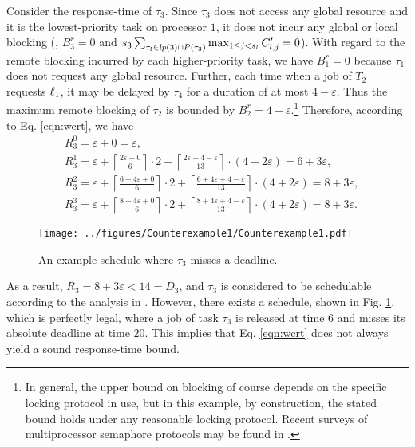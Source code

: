 Consider the response-time of $\tau_3$. Since $\tau_3$ does not access any global resource and it is the lowest-priority task on processor $1$, it does not incur any global or local blocking (\ie, $B_3^r = 0$ and $s_3 \sum_{\tau_l \in \mathit{lp}(3) \cap P(\tau_3)} \max_{1 \leq j < s_l} C_{l,j}^{\prime} = 0$). With regard to the remote blocking incurred by each higher-priority task, we have $B_1^r = 0$ because $\tau_1$ does not request any global resource. Further, each time when a job of $T_2$ requests $\ell_1$, it may be delayed by $\tau_4$ for a duration of at most $4-\varepsilon$. Thus the maximum remote blocking of $\tau_2$ is bounded by $B_2^r = 4-\varepsilon$.\footnote{In general, the upper bound on blocking of course depends on the specific locking protocol in use, but in this example, by construction, the stated bound holds under any reasonable locking protocol. Recent surveys of multiprocessor semaphore protocols may be found in \cite{bbb-2013,yang-2015}.} Therefore, according to Eq. \eqref{eqn:wcrt}, we have
\begin{align*}
& R_3^0 = \varepsilon + 0 = \varepsilon, \\
& R_3^1 = \varepsilon + \left \lceil \frac{2\varepsilon + 0}{6} \right \rceil \cdot 2 + \left \lceil \frac{2\varepsilon + 4 - \varepsilon}{13} \right \rceil \cdot (4+2\varepsilon) =  6+3\varepsilon, \\
& R_3^2 = \varepsilon + \left \lceil \frac{6+4\varepsilon + 0}{6} \right \rceil \cdot 2 + \left \lceil \frac{6+4\varepsilon + 4-\varepsilon}{13} \right \rceil \cdot (4+2\varepsilon) = 8+3\varepsilon, \\
& R_3^3 = \varepsilon + \left \lceil \frac{8+4\varepsilon + 0}{6} \right \rceil \cdot 2 + \left \lceil \frac{8+4\varepsilon + 4-\varepsilon}{13} \right \rceil \cdot (4+2\varepsilon) = 8+3\varepsilon.
\end{align*}

\ifpaper
\begin{figure}[t]
  \centering
  \texttt{[image: ../figures/Counterexample1/Counterexample1.pdf]}
  \caption{An example schedule where $\tau_3$ misses a deadline.}\label{fig:counterexample_protocol}
\end{figure}
 \fi

As a result, $R_3 = 8+3\varepsilon < 14 = D_3$, and $\tau_3$ is considered to be schedulable according to the analysis in \cite{lakshmanan-2009}. However, there exists a schedule, shown in Fig. \ref{fig:counterexample_protocol}, which is perfectly legal, where a job of task $\tau_3$  is released at time $6$ and misses its absolute deadline at time $20$. This implies that Eq. \eqref{eqn:wcrt} does not always yield a sound response-time bound. 

